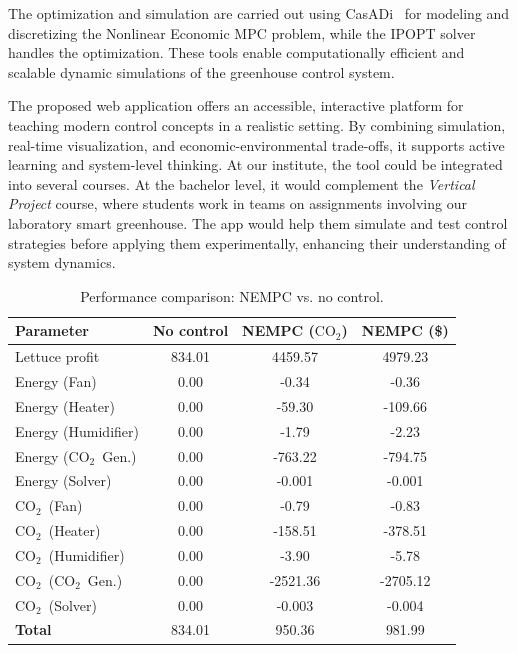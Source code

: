 \documentclass[conference]{IEEEtran}
\newcommand{\coo}{\ensuremath{\mathrm{CO_2}}}
\begin{document}
The optimization and simulation are carried out using CasADi~\cite{Andersson2019} for modeling and discretizing the Nonlinear Economic MPC problem, while the IPOPT solver~\cite{Wachter2006} handles the optimization. These tools enable computationally efficient and scalable dynamic simulations of the greenhouse control system.

The proposed web application offers an accessible, interactive platform for teaching modern control concepts in a realistic setting. By combining simulation, real-time visualization, and economic-environmental trade-offs, it supports active learning and system-level thinking. At our institute, the tool could be integrated into several courses. At the bachelor level, it would complement the \textit{Vertical Project} course, where students work in teams on assignments involving our laboratory smart greenhouse. The app would help them simulate and test control strategies before applying them experimentally, enhancing their understanding of system dynamics.

\begin{table}
    \centering
    \caption{Performance comparison: NEMPC {vs. } no control.}\label{tab:comparison}
    \setlength{\tabcolsep}{4pt} %
    \begin{tabular}{lS[table-format=3.2]S[table-format=4.2]S[table-format=4.2]}
        \toprule
        \textbf{Parameter}  & {No control} & {NEMPC (\coo)} & {NEMPC (\$)} \\
        \midrule
        Lettuce profit      & 834.01       & 4459.57        & 4979.23      \\
        Energy (Fan)        & 0.00         & -0.34          & -0.36        \\
        Energy (Heater)     & 0.00         & -59.30         & -109.66      \\
        Energy (Humidifier) & 0.00         & -1.79          & -2.23        \\
        Energy (\coo\ Gen.) & 0.00         & -763.22        & -794.75      \\
        Energy (Solver)     & 0.00         & -0.001         & -0.001       \\
        \coo\ (Fan)         & 0.00         & -0.79          & -0.83        \\
        \coo\ (Heater)      & 0.00         & -158.51        & -378.51      \\
        \coo\ (Humidifier)  & 0.00         & -3.90          & -5.78        \\
        \coo\ (\coo\ Gen.)  & 0.00         & -2521.36       & -2705.12     \\
        \coo\ (Solver)      & 0.00         & -0.003         & -0.004       \\
        \midrule
        \textbf{Total}      & 834.01       & 950.36         & 981.99       \\
        \bottomrule
    \end{tabular}
\end{table}
\end{document}
